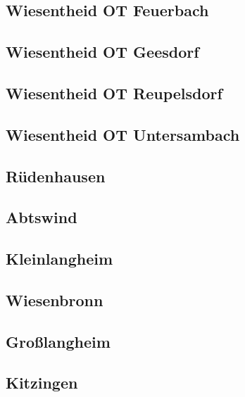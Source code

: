 \documentclass[fontsize=12pt,a4paper]{scrreprt}
\begin{document}
\subsection{Wiesentheid OT Feuerbach}


\subsection{Wiesentheid OT Geesdorf}


\subsection{Wiesentheid OT Reupelsdorf}


\subsection{Wiesentheid OT Untersambach}


\subsection{Rüdenhausen}


\subsection{Abtswind}


\subsection{Kleinlangheim}


\subsection{Wiesenbronn}


\subsection{Großlangheim}


\subsection{Kitzingen}

\end{document}
